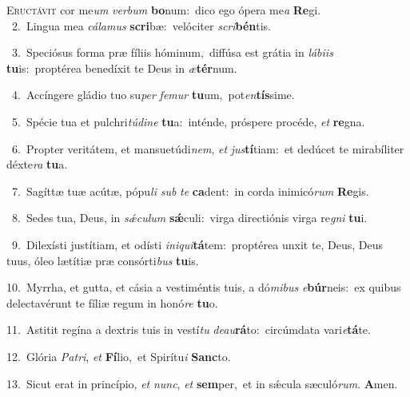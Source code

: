\lettrine{\initial\textcolor{\initialcolor}{E}}{ructávit} cor me\textit{um} \textit{ver}\-\textit{bum} \textbf{bo}\-num:~\star dico ego ópera me\textit{a} \textbf{Re}\-gi.\\
{\numbfont\textcolor{\numbcolor}{~2.}}~Lingua mea \textit{cá}\-\textit{la}\textit{mus} \textbf{scri}\-bæ:~\star velóciter \textit{scri}\-\textbf{bén}tis.\par
{\numbfont\textcolor{\numbcolor}{~3.}}~Speciósus forma præ fíliis hóminum,~\dagger diffúsa est grátia in \textit{lá}\-\textit{bi}\textit{is} \textbf{tu}\-is:~\star proptérea benedíxit te Deus in \textit{æ}\-\textbf{tér}num.\par
{\numbfont\textcolor{\numbcolor}{~4.}}~Accíngere gládio tuo su\textit{per} \textit{fe}\-\textit{mur} \textbf{tu}\-um,~\star pot\-\textit{en}\-\textbf{tís}sime.\par
{\numbfont\textcolor{\numbcolor}{~5.}}~Spécie tua et pulchri\-\textit{tú}\-\textit{di}\textit{ne} \textbf{tu}\-a:~\star inténde, próspere procéde, \textit{et} \textbf{re}\-gna.\par
{\numbfont\textcolor{\numbcolor}{~6.}}~Propter veritátem, et mansuetúdi\-\textit{nem}\-, \textit{et} \textit{jus}\-\textbf{tí}tiam:~\star et dedúcet te mirabíliter déxte\textit{ra} \textbf{tu}\-a.\par
{\numbfont\textcolor{\numbcolor}{~7.}}~Sagíttæ tuæ acútæ, pópu\textit{li} \textit{sub} \textit{te} \textbf{ca}\-dent:~\star in corda inimicó\textit{rum} \textbf{Re}\-gis.\par
{\numbfont\textcolor{\numbcolor}{~8.}}~Sedes tua, Deus, in \textit{sǽ}\-\textit{cu}\textit{lum} \textbf{sǽ}\-culi:~\star virga directiónis virga re\textit{gni} \textbf{tu}\-i.\par
{\numbfont\textcolor{\numbcolor}{~9.}}~Dilexísti justítiam, et odísti \textit{in}\-\textit{i}\textit{qui}\textbf{tá}tem:~\star proptérea unxit te, Deus, Deus tuus, óleo lætítiæ præ consórti\textit{bus} \textbf{tu}\-is.\par
{\numbfont\textcolor{\numbcolor}{10.}}~Myrrha, et gutta, et cásia a vestiméntis tuis, a dó\-\textit{mi}\-\textit{bus} \textit{e}\-\textbf{búr}neis:~\star ex quibus delectavérunt te fíliæ regum in honó\textit{re} \textbf{tu}\-o.\par
{\numbfont\textcolor{\numbcolor}{11.}}~Astitit regína a dextris tuis in vestí\textit{tu} \textit{de}\-\textit{au}\textbf{rá}to:~\star circúmdata vari\-\textit{e}\-\textbf{tá}te.\par
{\numbfont\textcolor{\numbcolor}{12.}}~Glória \textit{Pa}\-\textit{tri}, \textit{et} \textbf{Fí}\-lio,~\star et Spirítu\textit{i} \textbf{Sanc}\-to.\par
{\numbfont\textcolor{\numbcolor}{13.}}~Sicut erat in princípio, \textit{et} \textit{nunc}\-, \textit{et} \textbf{sem}\-per,~\star et in sǽcula sæculó\-\textit{rum}\-. \textbf{A}\-men.\par
